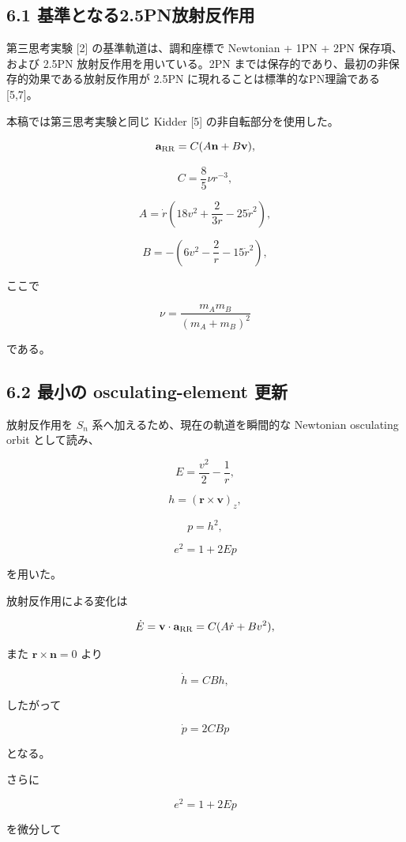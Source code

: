 \documentclass[
  a4paper,
]{ltjsarticle}
\begin{document}
\subsection{6.1
基準となる2.5PN放射反作用}\label{ux57faux6e96ux3068ux306aux308b2.5pnux653eux5c04ux53cdux4f5cux7528}

第三思考実験 {[}2{]} の基準軌道は、調和座標で Newtonian + 1PN + 2PN
保存項、および 2.5PN 放射反作用を用いている。2PN
までは保存的であり、最初の非保存的効果である放射反作用が 2.5PN
に現れることは標準的なPN理論である {[}5,7{]}。

本稿では第三思考実験と同じ Kidder {[}5{]} の非自転部分を使用した。

\[
\mathbf a_{\rm RR}
=C(A\mathbf n+B\mathbf v),
\]

\[
C=\frac85\nu r^{-3},
\]

\[
A
=\dot r
\left(
18v^2+\frac{2}{3r}-25\dot r^2
\right),
\]

\[
B
=-\left(
6v^2-\frac2r-15\dot r^2
\right),
\]

ここで

\[
\nu=\frac{m_Am_B}{(m_A+m_B)^2}
\]

である。

\subsection{6.2 最小の osculating-element
更新}\label{ux6700ux5c0fux306e-osculating-element-ux66f4ux65b0}

放射反作用を \(S_n\) 系へ加えるため、現在の軌道を瞬間的な Newtonian
osculating orbit として読み、

\[
E=\frac{v^2}{2}-\frac1r,
\]

\[
h=(\mathbf r\times\mathbf v)_z,
\]

\[
p=h^2,
\]

\[
e^2=1+2Ep
\]

を用いた。

放射反作用による変化は

\[
\dot E
=\mathbf v\cdot\mathbf a_{\rm RR}
=C(A\dot r+Bv^2),
\]

また \(\mathbf r\times\mathbf n=0\) より

\[
\dot h=CBh,
\]

したがって

\[
\boxed{
\dot p=2CBp
}
\]

となる。

さらに

\[
e^2=1+2Ep
\]

を微分して
\end{document}
